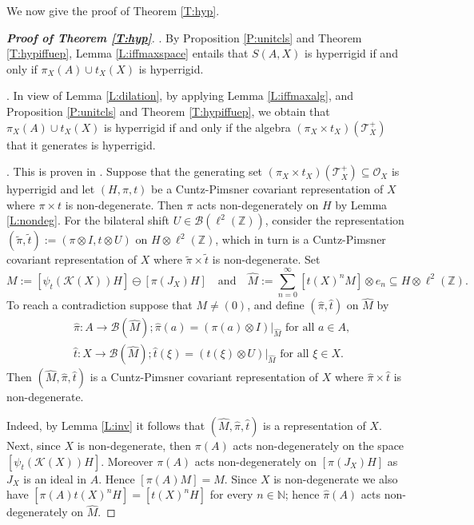 \documentclass[11pt, draft]{amsart}
\numberwithin{equation}{section}
\theoremstyle{plain}
\theoremstyle{definition}
\theoremstyle{remark}
\newcommand{\B}{{\mathcal{B}}}
\newcommand{\K}{{\mathcal{K}}}
\renewcommand{\O}{{\mathcal{O}}}
\newcommand{\T}{{\mathcal{T}}}
\newcommand{\bN}{\mathbb{N}}
\newcommand{\bZ}{\mathbb{Z}}
\newcommand{\foral}{\text{ for all }}
\newcommand{\qand}{\quad\text{and}\quad}
\newcommand{\wt}{\widetilde}
\newcommand{\wh}{\widehat}
\begin{document}
We now give the proof of Theorem \ref{T:hyp}.

\begin{proof}[{\bf Proof of Theorem \ref{T:hyp}}]

\noindent
[(i) $\Leftrightarrow$ (ii)]. 
By Proposition \ref{P:unitcls} and Theorem \ref{T:hypiffuep}, Lemma \ref{L:iffmaxspace} entails that $S(A,X)$ is hyperrigid if and only if $\pi_X(A) \cup t_X(X)$ is hyperrigid.

\medskip

. 
In view of Lemma \ref{L:dilation}, by applying Lemma \ref{L:iffmaxalg}, and Proposition \ref{P:unitcls} and Theorem \ref{T:hypiffuep}, we obtain that $\pi_X(A) \cup t_X(X)$ is hyperrigid if and only if the algebra $(\pi_X \times t_X)(\T_X^+)$ that it generates is hyperrigid.

\medskip

. 
This is proven in \cite[Theorem 2.7]{KR20}.
Suppose that the generating set $(\pi_X \times t_X)(\T_X^+) \subseteq \O_X$ is hyperrigid and let $(H,\pi,t)$ be a Cuntz-Pimsner covariant representation of $X$ where $\pi\times t$ is non-degenerate.
Then $\pi$ acts non-degenerately on $H$ by Lemma \ref{L:nondeg}.
For the bilateral shift $U \in \B(\ell^2(\bZ))$, consider the representation $(\wt{\pi}, \wt{t}) := (\pi \otimes I, t \otimes U)$ on $H \otimes \ell^2(\bZ)$, which in turn is a Cuntz-Pimsner covariant representation of $X$ where $\wt{\pi}\times \wt{t}$ is non-degenerate.
Set
\[
M:= [\psi_t(\K(X))H] \ominus [\pi(J_X)H] 
\qand
\wh{M} := \sum_{n = 0}^\infty [t(X)^n M] \otimes e_n \subseteq H \otimes \ell^2(\bZ).
\]
To reach a contradiction suppose that $M \neq (0)$, and define $(\wh{\pi}, \wh{t})$ on $\wh{M}$ by
\begin{align*}
& \wh{\pi} \colon A \to \B(\wh{M}); \wh{\pi}(a) = (\pi(a) \otimes I)|_{\wh{M}} \foral a \in A, \\
& \wh{t} \colon X \to \B(\wh{M}); \wh{t}(\xi) = (t(\xi) \otimes U)|_{\wh{M}} \foral \xi \in X.
\end{align*}
Then $(\wh{M}, \wh{\pi}, \wh{t})$ is a Cuntz-Pimsner covariant representation of $X$ where $\wh{\pi}\times \wh{t}$ is non-degenerate.

Indeed, by Lemma \ref{L:inv} it follows that $(\wh{M}, \wh{\pi}, \wh{t})$ is a representation of $X$. 
Next, since $X$ is non-degenerate, then $\pi(A)$ acts non-degenerately on the space $[\psi_t(\K(X))H]$.
Moreover $\pi(A)$ acts non-degenerately on $[\pi(J_X)H]$ as $J_X$ is an ideal in $A$.
Hence $[\pi(A) M] = M$.
Since $X$ is non-degenerate we also have $[\pi(A)t(X)^nH] = [t(X)^nH]$ for every $n \in \bN$; hence $\wh{\pi}(A)$ acts non-degenerately on $\wh{M}$.


\end{proof}
\end{document}
